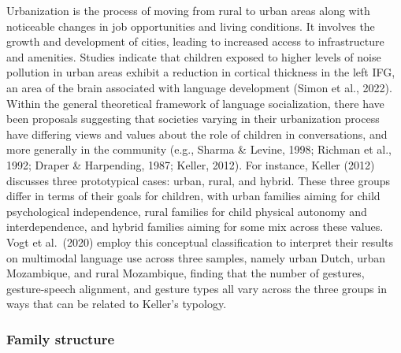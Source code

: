 \documentclass[
  man,floatsintext]{apa6}
\begin{document}
Urbanization is the process of moving from rural to urban areas along with noticeable changes in job opportunities and living conditions. It involves the growth and development of cities, leading to increased access to infrastructure and amenities. Studies indicate that children exposed to higher levels of noise pollution in urban areas exhibit a reduction in cortical thickness in the left IFG, an area of the brain associated with language development (Simon et al., 2022). Within the general theoretical framework of language socialization, there have been proposals suggesting that societies varying in their urbanization process have differing views and values about the role of children in conversations, and more generally in the community (e.g., Sharma \& Levine, 1998; Richman et al., 1992; Draper \& Harpending, 1987; Keller, 2012). For instance, Keller (2012) discusses three prototypical cases: urban, rural, and hybrid. These three groups differ in terms of their goals for children, with urban families aiming for child psychological independence, rural families for child physical autonomy and interdependence, and hybrid families aiming for some mix across these values. Vogt et al.~(2020) employ this conceptual classification to interpret their results on multimodal language use across three samples, namely urban Dutch, urban Mozambique, and rural Mozambique, finding that the number of gestures, gesture-speech alignment, and gesture types all vary across the three groups in ways that can be related to Keller's typology.

\subsubsection{Family structure}\label{family-structure}
\end{document}
